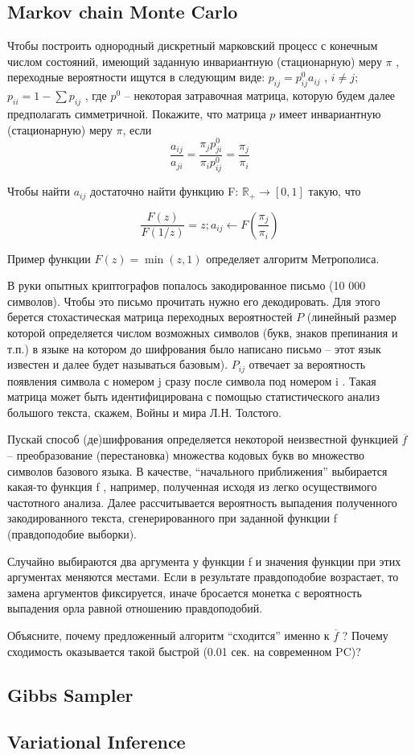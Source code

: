 \subsection{ Markov chain Monte Carlo }

\begin{problem}
Чтобы построить однородный дискретный марковский процесс с конечным числом состояний, имеющий заданную инвариантную (стационарную) меру $\pi$ , переходные вероятности ищутся в следующим виде: $p_{ij} = p_{ij}^0 a_{ij}$ , 
$i \neq j$; $p_{ii} = 1 - \sum p_{ij}$ , где $p^0$ – некоторая затравочная матрица, которую будем далее предполагать симметричной. Покажите, что матрица $p$ имеет инвариантную (стационарную) меру  $\pi$, если
\[
\frac{a_{ij}}{a_{ji}} = \frac{\pi_{j} p^0_{ji}}{\pi_{i} p^0_{ij}} = \frac{\pi_{j}}{\pi_{i}} 
\]

Чтобы найти  $a_{ij}$ достаточно найти функцию F: $\mathbb{R_+} \rightarrow [0,1]$ такую, что

\[
\frac{F(z)}{F(1/z)} = z; a_{ij}  \leftarrow F( \frac{\pi_{j}}{\pi_{i}} )
\]

Пример функции $F(z) = \min(z,1)$ определяет алгоритм Метрополиса. 

\end{problem}

\begin{problem}

В руки опытных криптографов попалось закодированное письмо (10 000 символов). Чтобы это письмо прочитать нужно его декодировать. Для этого берется стохастическая матрица переходных вероятностей $P$
(линейный размер которой определяется числом возможных символов (букв, знаков препинания и т.п.) в языке на котором до шифрования было написано письмо – этот язык известен и далее будет называться базовым). $P_{ij}$ отвечает за вероятность появления символа с номером j сразу после символа под номером i . Такая матрица может быть идентифицирована с помощью статистического анализ  большого текста, скажем,  Войны и мира Л.Н. Толстого.

Пускай способ (де)шифрования определяется некоторой неизвестной функцией $\overline{f}$ – преобразование (перестановка) множества кодовых букв во множество символов базового языка.
В качестве, “начального приближения” выбирается какая-то функция f , например,
полученная исходя из легко осуществимого частотного анализа. Далее рассчитывается вероятность выпадения полученного закодированного текста, сгенерированного при заданной функции f  (правдоподобие выборки).

Случайно  выбираются два аргумента у функции f и значения функции при этих аргументах меняются местами. Если в результате правдоподобие возрастает, то замена аргументов фиксируется, иначе бросается монетка с вероятность выпадения орла равной отношению правдоподобий. 

Объясните, почему предложенный алгоритм “сходится” именно к $\overline{f}$ ? Почему сходимость оказывается такой быстрой (0.01 сек. на современном PC)?


\end{problem}

\subsection{Gibbs Sampler}

\subsection{Variational Inference}